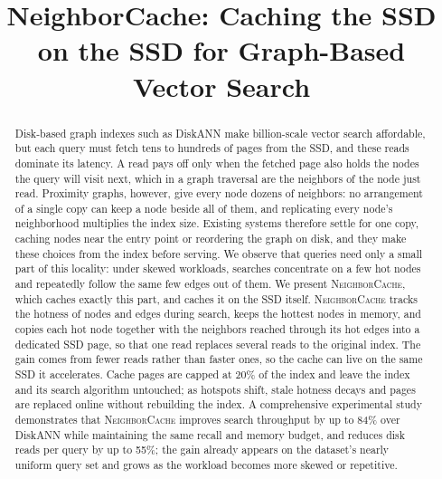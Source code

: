 \title{NeighborCache: Caching the SSD on the SSD for Graph-Based Vector Search}

\begin{abstract}
Disk-based graph indexes such as DiskANN make billion-scale vector search affordable, but each query must fetch tens to hundreds of pages from the SSD, and these reads dominate its latency.
A read pays off only when the fetched page also holds the nodes the query will visit next, which in a graph traversal are the neighbors of the node just read.
Proximity graphs, however, give every node dozens of neighbors: no arrangement of a single copy can keep a node beside all of them, and replicating every node's neighborhood multiplies the index size.
Existing systems therefore settle for one copy, caching nodes near the entry point or reordering the graph on disk, and they make these choices from the index before serving.
We observe that queries need only a small part of this locality: under skewed workloads, searches concentrate on a few hot nodes and repeatedly follow the same few edges out of them.
We present \textsc{NeighborCache}, which caches exactly this part, and caches it on the SSD itself.
\textsc{NeighborCache} tracks the hotness of nodes and edges during search, keeps the hottest nodes in memory, and copies each hot node together with the neighbors reached through its hot edges into a dedicated SSD page, so that one read replaces several reads to the original index.
The gain comes from fewer reads rather than faster ones, so the cache can live on the same SSD it accelerates.
Cache pages are capped at 20\% of the index and leave the index and its search algorithm untouched; as hotspots shift, stale hotness decays and pages are replaced online without rebuilding the index.
A comprehensive experimental study demonstrates that \textsc{NeighborCache} improves search throughput by up to 84\% over DiskANN while maintaining the same recall and memory budget, and reduces disk reads per query by up to 55\%; the gain already appears on the dataset's nearly uniform query set and grows as the workload becomes more skewed or repetitive.
\end{abstract}
